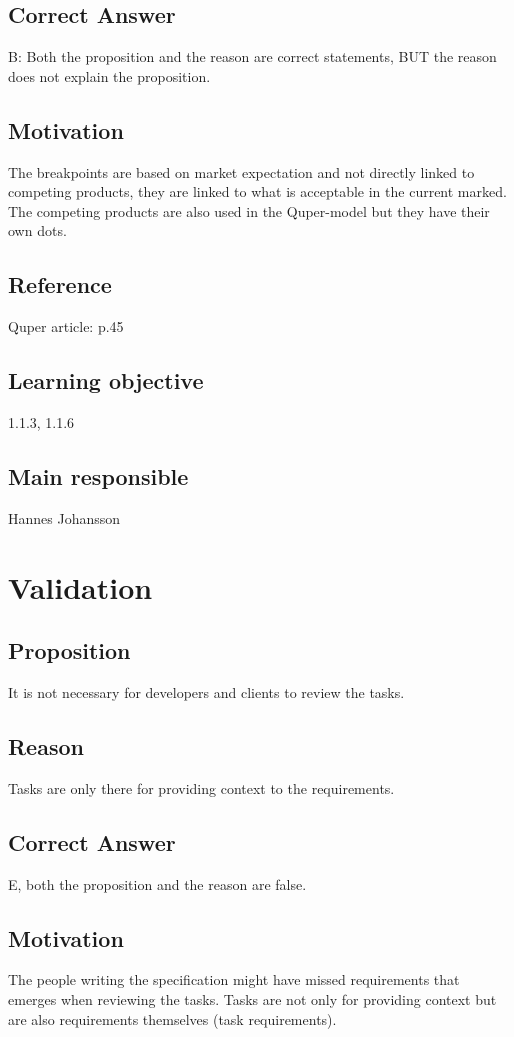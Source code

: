\documentclass[a4paper]{article}
\begin{document}
\subsection*{Correct Answer}
B: Both the proposition and the reason are correct statements, BUT the reason does not explain the proposition.
\subsection*{Motivation}
The breakpoints are based on market expectation and not directly linked to competing products, they are linked to what is acceptable in the current marked. The competing products are also used in the Quper-model but they have their own dots.
\subsection*{Reference}
Quper article: p.45
\subsection*{Learning objective}
1.1.3, 1.1.6
\subsection*{Main responsible}
Hannes Johansson

\section{Validation}
\subsection*{Proposition}
It is not necessary for developers and clients to review the tasks.
\subsection*{Reason}
Tasks are only there for providing context to the requirements.
\subsection*{Correct Answer}
E, both the proposition and the reason are false.
\subsection*{Motivation}
The people writing the specification might have missed requirements that emerges when reviewing the tasks. Tasks are not only for providing context but are also requirements themselves (task requirements).
\end{document}

